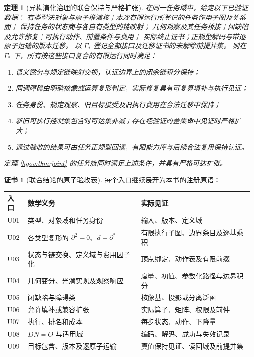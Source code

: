 \documentclass[12pt,a4paper,openany,notitlepage]{report}
\theoremstyle{plain}
\newtheorem{theorem}{定理}[chapter]
\theoremstyle{definition}
\newtheorem*{certificate}{证书}
\theoremstyle{remark}
\begin{document}
\begin{CJK*}{UTF8}{gkai}
\begin{theorem}[异构演化治理的联合保持与严格扩张]
\label{hgov:thm:main}
在同一任务域中，给定以下已验证数据：
有类型法对象与原子推演核；本次有限运行所登记的任务作用子图及关系面；
保持任务的状态商与各自有类型的链映射；
几何观察及其任务桥接；闭缺陷及允许修复；可执行动作、前置条件与费用；
实际终止证书；正规型解码与带逐原子运输的版本迁移。
以 $\Gamma_*$ 登记全部接口及迁移证书的未解除前提并集。
则在 $\Gamma_*$ 下，所有按这些接口复合的有限运行同时满足：
\begin{enumerate}[label=(\roman*)]
\item 语义微分与规定链映射交换，认证边界上的闭余链积分保持；
\item 同调障碍由明确核像或运算复形判定，实际修复具有可复算填补与执行见证；
\item 任务身份、规定观察、旧目标接受及旧执行费用在合法迁移中保持；
\item 新旧可执行控制集包含时可达集非减；存在经验证的差集命中见证时严格扩大；
\item 通过验收的结果可由任务正规型回读，有限能力库与后续合法复用保持认证。
\end{enumerate}
定理 \ref{hgov:thm:joint} 的任务族同时满足上述条件，并具有严格可达扩张。
\end{theorem}
\begin{certificate}[联合结论的原子验收表]
每个入口继续展开为本书的注册原语：
\begin{center}\small
\begin{tabularx}{\textwidth}{P{.10\textwidth}YY}
\toprule
入口 & 数学义务 & 实际见证\\
\midrule
U01 & 类型、对象域和任务身份 & 输入、版本、定义域\\
U02 & 各类型复形的 $\partial^2=0$、$d=\partial^*$ & 有限执行子图、边界条目及逐基乘积\\
U03 & 状态与链交换、定义域与费用因子化 & 顶点绑定、动作表及有限前缀\\
U04 & 几何变分、光滑实现及观察响应 & 度量、初值、参数化路径与边界积分\\
U05 & 闭缺陷与障碍类 & 核像基、投影或分离泛函\\
U06 & 允许填补或兼容扩张 & 实际算子、矩阵、权限及前件\\
U07 & 执行、排名和成本 & 每步状态、动作、下降量\\
U08 & $DN=O$ 与适用域 & 编码、解码、成功与失效记录\\
U09 & 目标包含、版本及逐原子运输 & 真值保持见证、读回域及前提并集\\
\bottomrule
\end{tabularx}

\end{center}
\end{certificate}
\end{CJK*}
\end{document}

